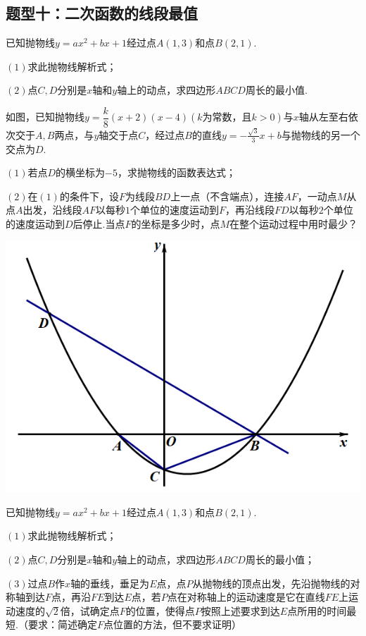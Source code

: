 \documentclass[10pt]{ctexart}
\begin{document}
\subsection{题型十：二次函数的线段最值}
\begin{dkyi}{}{}
  已知抛物线$y=ax^2+bx+1$经过点$A(1,3)$和点$B(2,1)$.
  
  $(1)$求此抛物线解析式；
  
  $(2)$点$C,D$分别是$x$轴和$y$轴上的动点，求四边形$ABCD$周长的最小值.
\end{dkyi}
\begin{dkyi}{}{}
  如图，已知抛物线$y=\dfrac{k}{8}(x+2)(x-4)(k\text{为常数，且}k>0)$与$x$轴从左至右依次交于$A,B$两点，与$y$轴交于点$C$，经过点$B$的直线$y=-\frac{\sqrt{3}}{3}x+b$与抛物线的另一个交点为$D$.
  
  $(1)$若点$D$的横坐标为$-5$，求抛物线的函数表达式；
  
  $(2)$在$(1)$的条件下，设$F$为线段$BD$上一点（不含端点），连接$AF$，一动点$M$从点$A$出发，沿线段$AF$以每秒$1$个单位的速度运动到$F$，再沿线段$FD$以每秒$2$个单位的速度运动到$D$后停止.当点$F$的坐标是多少时，点$M$在整个运动过程中用时最少？
\end{dkyi}

\centering
\includegraphics[scale=0.4]{figure/l-25-1.PNG} 
\begin{dkyi}{}{}
  已知抛物线$y=ax^2+bx+1$经过点$A(1,3)$和点$B(2,1)$.
  
  $(1)$求此抛物线解析式；
  
  $(2)$点$C,D$分别是$x$轴和$y$轴上的动点，求四边形$ABCD$周长的最小值；
  
  $(3)$过点$B$作$x$轴的垂线，垂足为$E$点，点$P$从抛物线的顶点出发，先沿抛物线的对称轴到达$F$点，再沿$FE$到达$E$点，若$P$点在对称轴上的运动速度是它在直线$FE$上运动速度的$\sqrt{2}$倍，试确定点$F$的位置，使得点$P$按照上述要求到达$E$点所用的时间最短.（要求：简述确定$F$点位置的方法，但不要求证明）
\end{dkyi}
\end{document}
